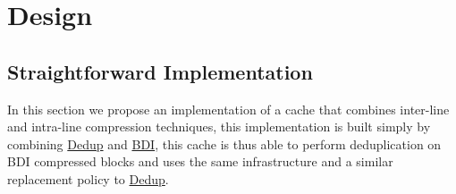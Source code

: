 
\chapter{Design}
\label{ch:Design}



\section{Straightforward Implementation}
\label{sec:Straightforward Implementation}
In this section we propose an implementation of a cache that combines inter-line and intra-line compression techniques, this implementation is built simply by combining \hyperref[sec:Dedup]{Dedup} and \hyperref[sec:BDI]{BDI}, this cache is thus able to perform deduplication on BDI compressed blocks and uses the same infrastructure and a similar replacement policy to \hyperref[sec:Dedup]{Dedup}.

